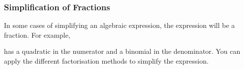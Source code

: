             \subsubsection{ Simplification of Fractions}
            \nopagebreak
      \label{m39392*id279238}In some cases of simplifying an algebraic expression, the expression will be a fraction. For example,\par 
      \label{m39392*id279242}\nopagebreak\noindent{}
      \label{m39392*id279276}has a quadratic in the numerator and a binomial in the denominator. You can apply the different factorisation methods to simplify the expression.\par 
      \label{m39392*id279282}\nopagebreak\noindent{}
